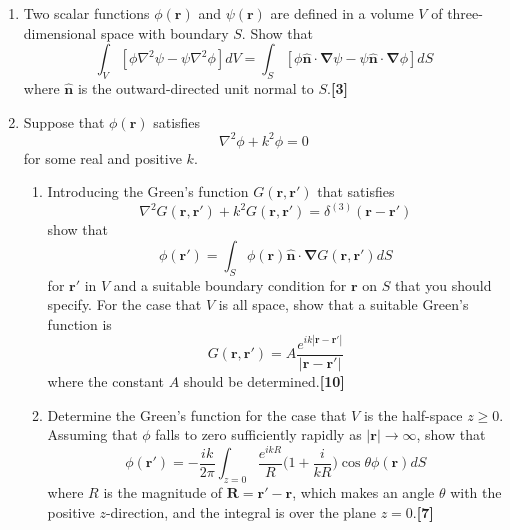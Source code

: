 \documentclass[a4paper]{article}
\begin{document}
\begin{qns}\leavevmode
\begin{enumerate}[label=(\roman*)]
\item Two scalar functions $\phi(\mathbf{r})$ and $\psi(\mathbf{r})$ are defined in a volume $V$ of three-dimensional space with boundary $S$. Show that
$$\int_V[\phi\nabla^2\psi-\psi\nabla^2\phi]dV=\int_S[\phi\mathbf{\hat{n}}\cdot\boldsymbol{\nabla}\psi-\psi\mathbf{\hat{n}}\cdot\boldsymbol{\nabla}\phi]dS$$
where $\mathbf{\hat{n}}$ is the outward-directed unit normal to $S$.\hfill\textbf{[3]}
\item Suppose that $\phi(\mathbf{r})$ satisfies
$$\nabla^2\phi+k^2\phi=0$$
for some real and positive $k$.
\begin{enumerate}[label=(\alph*)]
\item Introducing the Green’s function $G(\mathbf{r}, \mathbf{r'})$ that satisfies
$$\nabla^2G(\mathbf{r},\mathbf{r'})+k^2G(\mathbf{r},\mathbf{r'})=\delta^{(3)}(\mathbf{r}-\mathbf{r'})$$
show that
$$\phi(\mathbf{r'})=\int_S\phi(\mathbf{r})\mathbf{\hat{n}}\cdot\boldsymbol{\nabla}G(\mathbf{r},\mathbf{r'})dS$$
for $\mathbf{r'}$ in $V$ and a suitable boundary condition for $\mathbf{r}$ on $S$ that you should specify. For the case that $V$ is all space, show that a suitable Green’s function is
$$G(\mathbf{r},\mathbf{r'})=A\frac{e^{ik|\mathbf{r}-\mathbf{r'}|}}{|\mathbf{r}-\mathbf{r'}|}$$
where the constant $A$ should be determined.\hfill\textbf{[10]}
\item Determine the Green’s function for the case that $V$ is the half-space $z\geq0$.\\[5pt]
Assuming that $\phi$ falls to zero sufficiently rapidly as $|\mathbf{r}|\rightarrow\infty$, show that
$$\phi(\mathbf{r'})=-\frac{ik}{2\pi}\int_{z=0}\frac{e^{ikR}}{R}\bigg(1+\frac{i}{kR}\bigg)\cos\theta\phi(\mathbf{r})dS$$
where $R$ is the magnitude of $\mathbf{R}=\mathbf{r'}-\mathbf{r}$, which makes an angle $\theta$ with the positive $z$-direction, and the integral is over the plane $z=0$.\hfill\textbf{[7]}
\end{enumerate}
\end{enumerate}
\end{qns}
\newpage
\end{document}
